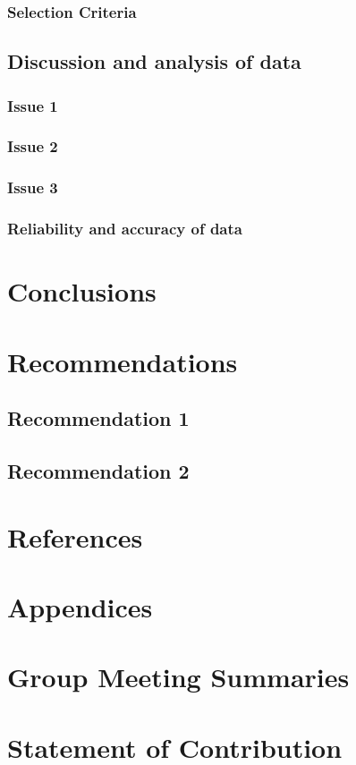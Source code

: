 \documentclass[12pt,twoside,a4paper]{article}
\begin{document}
\subsubsection{Selection Criteria}

\subsection{Discussion and analysis of data}

\subsubsection{Issue 1}

\subsubsection{Issue 2}

\subsubsection{Issue 3}

\subsubsection{Reliability and accuracy of data}

\section{Conclusions}

\section{Recommendations}

\subsection{Recommendation 1}

\subsection{Recommendation 2}

\section{References}

\section{Appendices}

\section{Group Meeting Summaries}

\section{Statement of Contribution}
 
\end{document}
